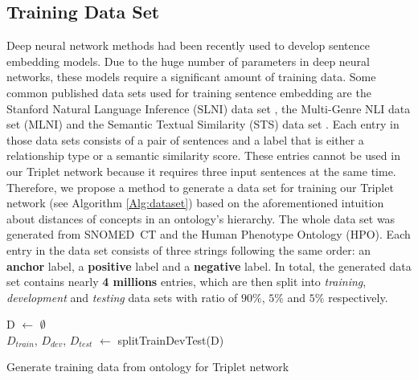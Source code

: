 \documentclass[preprint,12pt]{elsarticle}
\begin{document}
\subsection*{Training Data Set}
\label{sec:TrainingDatasets}
Deep neural network methods had been recently used to develop sentence embedding models. Due to the huge number of parameters in deep neural networks, these models require a significant amount of training data. Some common published data sets used for training sentence embedding are the Stanford Natural Language Inference (SLNI) data set \cite{Samuel2015}, the Multi-Genre NLI data set (MLNI) \cite{Adina2018} and the Semantic Textual Similarity (STS) data set \cite{Daniel2017}. Each entry in those data sets consists of a pair of sentences and a label that is either a relationship type or a semantic similarity score. These entries cannot be used in our Triplet network because it requires three input sentences at the same time. Therefore, we propose a method to generate a data set for training our Triplet network (see Algorithm \ref{Alg:dataset}) based on the aforementioned intuition about distances of concepts in an ontology's hierarchy. The whole data set was generated from SNOMED~CT and the Human Phenotype Ontology (HPO). Each entry in the data set consists of three strings following the same order: an \textbf{anchor} label, a \textbf{positive} label and a \textbf{negative} label.  In total, the generated data set contains nearly \textbf{4 millions} entries, which are then split into \textit{training}, \textit{development} and \textit{testing} data sets with ratio of $90\%$, $5\%$ and $5\%$ respectively.

\begin{algorithm}[htbp]
\SetAlgoLined
{}
D $\gets$ $\emptyset$\\
$D_{train}$, $D_{dev}$, $D_{test}$ $\gets$ splitTrainDevTest(D)
\caption{Generate training data from ontology for Triplet network}
\label{Alg:dataset}
\end{algorithm}
\end{document}
